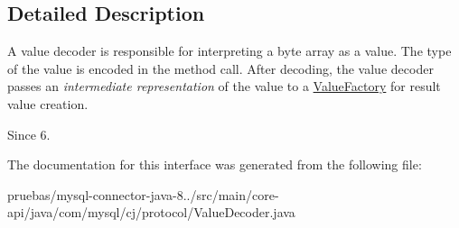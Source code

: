 \subsection{Detailed Description}
A value decoder is responsible for interpreting a byte array as a value. The type of the value is encoded in the method call. After decoding, the value decoder passes an {\itshape intermediate representation} of the value to a \mbox{\hyperlink{}{Value\+Factory}} for result value creation.

\begin{DoxySince}{Since}
6. 
\end{DoxySince}


The documentation for this interface was generated from the following file\+:\begin{DoxyCompactItemize}
\item 
pruebas/mysql-\/connector-\/java-\/8../src/main/core-\/api/java/com/mysql/cj/protocol/Value\+Decoder.\+java\end{DoxyCompactItemize}
